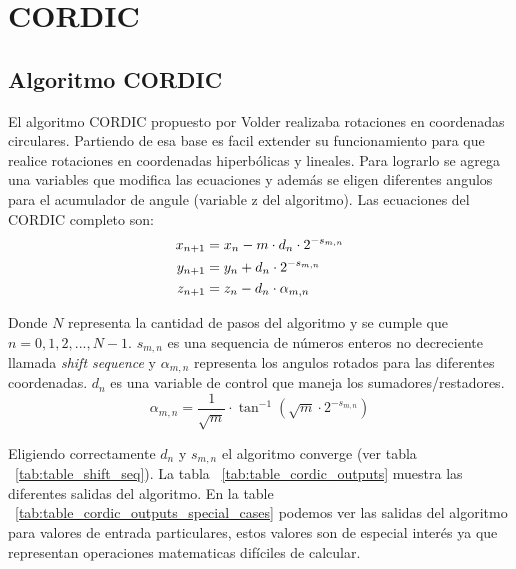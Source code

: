 \documentclass[10pt,a4paper]{book}
\begin{document}
\chapter{CORDIC}

\section{Algoritmo CORDIC}

El algoritmo CORDIC propuesto por Volder realizaba rotaciones en coordenadas circulares.
Partiendo de esa base es facil extender su funcionamiento para que realice rotaciones en coordenadas hiperbólicas y lineales. Para lograrlo se agrega una variables que modifica las ecuaciones y además se eligen diferentes angulos para el acumulador de angule (variable z del algoritmo).
Las ecuaciones del CORDIC completo son:
\begin{equation} \label{eq:cordic_eq}
   \begin{subequations}
      \begin{aligned}
         x_{n+1} &=  x_n - m \cdot d_n \cdot 2^{-s_{m,n}}   \\
         y_{n+1} &=  y_n + d_n \cdot 2^{-s_{m,n}}             \\
         z_{n+1} &=  z_n - d_n \cdot \alpha_{m,n}
      \end{aligned}
   \end{subequations}
\end{equation}

Donde $N$ representa la cantidad de pasos del algoritmo y se cumple que $n= 0, 1, 2, ... , N-1$. $s_{m,n}$ es una sequencia de números enteros no decreciente llamada \textit{shift sequence} y $\alpha_{m,n}$ representa los angulos rotados para las diferentes coordenadas. $d_n$ es una variable de control que maneja los sumadores/restadores.
\begin{equation} \label{eq:rotation_angle}
   \alpha_{m,n} = \dfrac {1}{\sqrt{m}} \cdot \tan^{-1}(\sqrt{m} \cdot 2^{-s_{m,n}} )
\end{equation}

Eligiendo correctamente $d_n$ y $s_{m,n}$ el algoritmo converge (ver tabla ~\ref{tab:table_shift_seq}). La tabla ~\ref{tab:table_cordic_outputs} muestra las diferentes salidas del algoritmo. En la table ~\ref{tab:table_cordic_outputs_special_cases} podemos ver las salidas del algoritmo para valores de entrada particulares, estos valores son de especial interés ya que representan operaciones matematicas difíciles de calcular.
\end{document}
